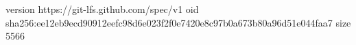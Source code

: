 version https://git-lfs.github.com/spec/v1
oid sha256:ee12eb9ecd90912eefc98d6e023f2f0e7420e8c97b0a673b80a96d51e044faa7
size 5566
